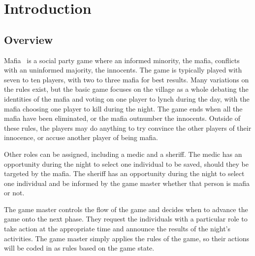 \documentclass[12pt]{article} %
\begin{document}

\tableofcontents 
\newpage  


\section{Introduction} 


\subsection{Overview} 

Mafia~\cite{PRI2015} is a social party game where an informed minority, the mafia, conflicts with an uninformed majority, the innocents. The game is typically played with seven to ten players, with two to three mafia for best results. Many variations on the rules exist, but the basic game focuses on the village as a whole debating the identities of the mafia and voting on one player to lynch during the day, with the mafia choosing one player to kill during the night. The game ends when all the mafia have been eliminated, or the mafia outnumber the innocents. Outside of these rules, the players may do anything to try convince the other players of their innocence, or accuse another player of being mafia. 

Other roles can be assigned, including a medic and a sheriff. The medic has an opportunity during the night to select one individual to be saved, should they be targeted by the mafia. The sheriff has an opportunity during the night to select one individual and be informed by the game master whether that person is mafia or not. 
 
The game master controls the flow of the game and decides when to advance the game onto the next phase. They request the individuals with a particular role to take action at the appropriate time and announce the results of the night’s activities. The game master simply applies the rules of the game, so their actions will be coded in as rules based on the game state. 
\end{document}

